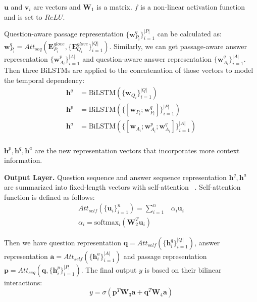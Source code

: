 \documentclass[11pt,a4paper]{article}
\begin{document}
$\mathbf{u}$ and $\mathbf{v}_i$ are vectors
and $\mathbf{W}_1$ is a matrix.
$f$ is a non-linear activation function
and is set to $ReLU$.

Question-aware passage representation $\{\mathbf{w}_{P_i}^q\}_{i=1}^{|P|}$ can be calculated as:
$\mathbf{w}_{P_i}^q = Att_{seq}(\mathbf{E}_{P_i}^{glove}, \{\mathbf{E}_{Q_i}^{glove}\}_{i=1}^{|Q|})$.
Similarly,
we can get passage-aware answer representation $\{\mathbf{w}_{A_i}^p\}_{i=1}^{|A|}$
and question-aware answer representation $\{\mathbf{w}_{A_i}^q\}_{i=1}^{|A|}$.
Then three BiLSTMs are applied
to the concatenation of those vectors to model the temporal dependency:
\begin{equation}
\begin{aligned}
\mathbf{h}^q & = \mathrm{BiLSTM}(\{\mathbf{w}_{Q_i}\}_{i=1}^{|Q|}) \\
\mathbf{h}^p & = \mathrm{BiLSTM}(\{[\mathbf{w}_{P_i}; \mathbf{w}_{P_i}^q]\}_{i=1}^{|P|}) \\
\mathbf{h}^a & = \mathrm{BiLSTM}(\{[\mathbf{w}_{A_i}; \mathbf{w}_{A_i}^p; \mathbf{w}_{A_i}^q]\}_{i=1}^{|A|}) \\
\end{aligned}
\end{equation}

$\mathbf{h}^p, \mathbf{h}^q, \mathbf{h}^a$ are the new representation vectors
that incorporates more context information.

\noindent
\textbf{Output Layer. }
Question sequence and answer sequence representation $\mathbf{h}^q, \mathbf{h}^a$
are summarized into fixed-length vectors with self-attention ~\cite{yang2016hierarchical}.
Self-attention function is defined as follows:
\begin{equation}
\begin{aligned}
Att_{self}(\{\mathbf{u}_i\}_{i=1}^n) = \sum_{i=1}^{n}&{\alpha_i \mathbf{u}_i} \\
\alpha_i = \mathrm{softmax}_i(\mathbf{W}_2^T \mathbf{u}_i)&
\end{aligned}
\end{equation}

Then we have question representation $\mathbf{q} = Att_{self}(\{\mathbf{h}_i^q\}_{i=1}^{|Q|})$,
answer representation $\mathbf{a} = Att_{self}(\{\mathbf{h}_i^a\}_{i=1}^{|A|})$
and passage representation $\mathbf{p} = Att_{seq}(\mathbf{q}, \{\mathbf{h}_i^p\}_{i=1}^{|P|})$.
The final output $y$ is based on their bilinear interactions:
\begin{equation}
y = \sigma(\mathbf{p}^T\mathbf{W}_3\mathbf{a} + \mathbf{q}^T\mathbf{W}_4\mathbf{a})
\end{equation}
\end{document}
